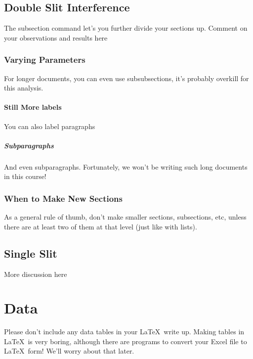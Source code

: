 \documentclass[12pt]{article}
\begin{document}
    \subsection{Double Slit Interference}
		The subsection command let's you further divide your sections up.  Comment on your observations and results here
        
        \subsubsection{Varying Parameters}
        	For longer documents, you can even use subsubsections, 
            it's probably overkill for this analysis.
            
            \paragraph{Still More labels}
            	You can also label paragraphs
                
                \subparagraph{Subparagraphs}
                	And even subparagraphs.  Fortunately, we won't be 
                    writing such long documents in this course!
       
       \subsubsection{When to Make New Sections}
        	As a general rule of thumb, don't make smaller sections, subsections, etc, unless there are at least two of them at that level (just like with lists).
	
    \subsection{Single Slit}
		More discussion here
        
\section{Data}
	Please don't include any data tables in your \LaTeX\, write up.  Making tables in \LaTeX\, is very boring, although there are programs to convert your Excel file to \LaTeX\, form!  We'll worry about that later.

{}

\end{document}

